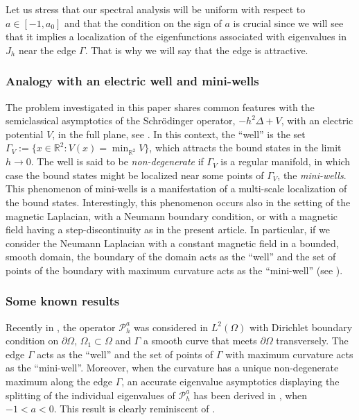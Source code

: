 \documentclass[JEP,XML,SOM,Unicode,NoFloatCountersInSection,published]{cedram}
\let\sep:
\newcommand{\cP}{\mathcal{P}}
\theoremstyle{plain}
\theoremstyle{definition}
\begin{document}
Let us stress that our spectral analysis will be uniform with respect to $a\in[-1,a_0]$ and that the condition on the sign of $a$ is crucial since we will see that it implies a localization of the eigenfunctions associated with eigenvalues in $J_h$ near the edge $\Gamma$. That is why we will say that the edge is attractive.

\subsubsection{Analogy with an electric well and mini-wells}
The problem investigated in this paper shares common features with the semiclassical asymptotics of the Schrödinger operator, $-h^2\Delta+V$, with an electric potential $V$, in the full plane, see \cite{HeSj,HeSj5,Simon, HS6}. In this context, the \enquote{well} is the set $\Gamma_V:=\{x\in\mathbb R^2\sep V(x)=\min_{\mathbb R^2} V\}$, which attracts the bound states in the limit $h\to0$. The well is said to be \emph{non-degenerate} if $\Gamma_V$ is a regular manifold, in which case the bound states might be localized near some points of $\Gamma_V$, the \emph{mini-wells}. This phenomenon of mini-wells is a manifestation of a multi-scale localization of the bound states. Interestingly, this phenomenon occurs also in the setting of the magnetic Laplacian, with a Neumann boundary condition, or with a magnetic field having a step-discontinuity as in the present article. In particular, if we consider the Neumann Laplacian with a constant magnetic field in a bounded, smooth domain, the boundary of the domain acts as the \enquote{well}
and the set of points of the boundary with maximum curvature acts as the \enquote{mini-well} (see \cite{HM01,FH06}).

\subsubsection{Some known results}
Recently in \cite{AHK, AK20}, the operator $\cP^a_h$ was considered in $L^2(\Omega)$ with Dirichlet boundary condition on $\partial \Omega$, $\Omega_1\subset \Omega$ and $\Gamma$ a smooth curve that meets $\partial\Omega$ transversely. The edge $\Gamma$ acts as the ``well'' and the set of points of $\Gamma$ with maximum curvature acts as the ``mini-well''.
Moreover, when the curvature has a unique non-degenerate maximum along the edge $\Gamma$, an accurate eigenvalue asymptotics displaying the splitting of the individual eigenvalues of $\cP^a_h$ has been derived in \cite[Th.\,1.2]{AHK}, when $-1<a<0$. This result is clearly reminiscent of \cite{FH06}.
\end{document}
